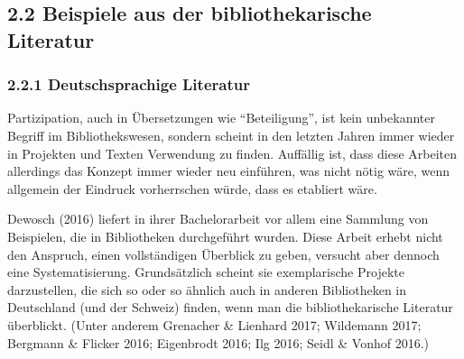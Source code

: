 \documentclass[a4paper,
fontsize=11pt,
oneside,
numbers=noperiodatend,
parskip=half-,
bibliography=totoc,
final
]{scrartcl}
\begin{document}
\hypertarget{beispiele-aus-der-bibliothekarische-literatur}{%
\subsection{2.2 Beispiele aus der bibliothekarische
Literatur}\label{beispiele-aus-der-bibliothekarische-literatur}}

\hypertarget{deutschsprachige-literatur}{%
\subsubsection{2.2.1 Deutschsprachige
Literatur}\label{deutschsprachige-literatur}}

Partizipation, auch in Übersetzungen wie \enquote{Beteiligung}, ist kein
unbekannter Begriff im Bibliothekswesen, sondern scheint in den letzten
Jahren immer wieder in Projekten und Texten Verwendung zu finden.
Auffällig ist, dass diese Arbeiten allerdings das Konzept immer wieder
neu einführen, was nicht nötig wäre, wenn allgemein der Eindruck
vorherrschen würde, dass es etabliert wäre.

Dewosch (2016) liefert in ihrer Bachelorarbeit vor allem eine Sammlung
von Beispielen, die in Bibliotheken durchgeführt wurden. Diese Arbeit
erhebt nicht den Anspruch, einen vollständigen Überblick zu geben,
versucht aber dennoch eine Systematisierung. Grundsätzlich scheint sie
exemplarische Projekte darzustellen, die sich so oder so ähnlich auch in
anderen Bibliotheken in Deutschland (und der Schweiz) finden, wenn man
die bibliothekarische Literatur überblickt. (Unter anderem Grenacher \&
Lienhard 2017; Wildemann 2017; Bergmann \& Flicker 2016; Eigenbrodt
2016; Ilg 2016; Seidl \& Vonhof 2016.)
\end{document}
